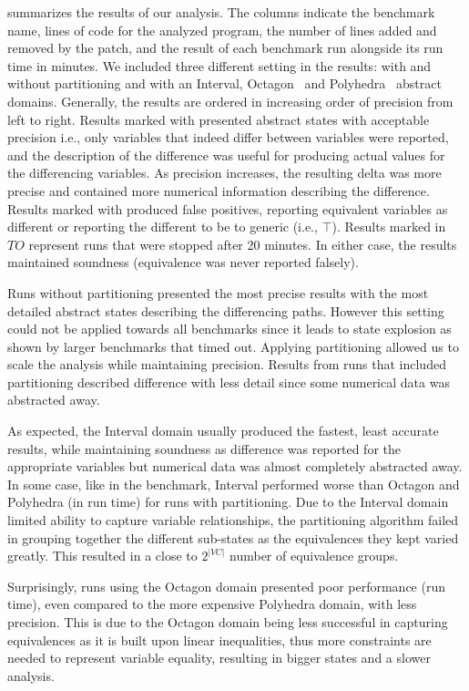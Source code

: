  summarizes the results of our analysis. The columns indicate the benchmark name, lines of code for the analyzed program, the number of lines added and removed by the patch, and the result of each benchmark run alongside its run time in minutes. We included three different setting in the results: with and without partitioning and with an Interval, Octagon~\cite{Mine2006} and Polyhedra~\cite{CousotHalbwachs78} abstract domains. Generally, the results are ordered in increasing order of precision from left to right. Results marked with \checkmark presented abstract states with acceptable precision i.e., only variables that indeed differ between variables were reported, and the description of the difference was useful for producing actual values for the differencing variables. As precision increases, the resulting delta was more precise and contained more numerical information describing the difference. Results marked with \xmark produced false positives, reporting equivalent variables as different or reporting the different to be to generic (i.e., $\top$). Results marked in $TO$ represent runs that were stopped after 20 minutes. In either case, the results maintained soundness (equivalence was never reported falsely).

Runs without partitioning presented the most precise results with the most detailed abstract states describing the differencing paths. However this setting could not be applied towards all benchmarks since it leads to state explosion as shown by larger benchmarks that timed out. Applying partitioning allowed us to scale the analysis while maintaining precision. Results from runs that included partitioning described difference with less detail since some numerical data was abstracted away.

As expected, the Interval domain usually produced the fastest, least accurate results, while maintaining soundness as difference was reported for the appropriate variables but numerical data was almost completely abstracted away. In some case, like in the  benchmark, Interval performed worse than Octagon and Polyhedra (in run time) for runs with partitioning. Due to the Interval domain limited ability to capture variable relationships, the partitioning algorithm failed in grouping together the different sub-states as the equivalences they kept varied greatly. This resulted in a close to $2^{|VC|}$ number of equivalence groups. 

Surprisingly, runs using the Octagon domain presented poor performance (run time), even compared to the more expensive Polyhedra domain, with less precision. This is due to the Octagon domain being less successful in capturing equivalences as it is built upon linear inequalities, thus more constraints are needed to represent variable equality, resulting in bigger states and a slower analysis.


